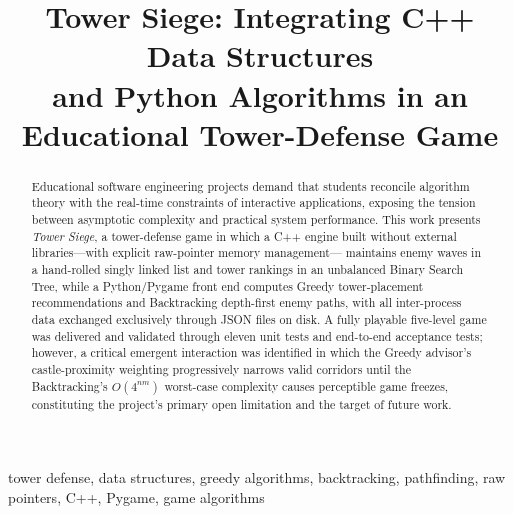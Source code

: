 \documentclass[conference]{IEEEtran}
\begin{document}

\title{Tower Siege: Integrating C++ Data Structures\\and Python Algorithms in an Educational Tower-Defense Game}

\author{
}

\maketitle

\begin{abstract}
Educational software engineering projects demand that students reconcile
algorithm theory with the real-time constraints of interactive applications,
exposing the tension between asymptotic complexity and practical system
performance.
This work presents \emph{Tower Siege}, a tower-defense game in which a C++ engine
built without external libraries—with explicit raw-pointer memory management—
maintains enemy waves in a hand-rolled singly linked list and tower rankings
in an unbalanced Binary Search Tree, while a Python/Pygame front end computes
Greedy tower-placement recommendations and Backtracking depth-first enemy paths,
with all inter-process data exchanged exclusively through JSON files on disk.
A fully playable five-level game was delivered and validated through eleven unit
tests and end-to-end acceptance tests; however, a critical emergent interaction
was identified in which the Greedy advisor's castle-proximity weighting
progressively narrows valid corridors until the Backtracking's $O(4^{nm})$
worst-case complexity causes perceptible game freezes, constituting the project's
primary open limitation and the target of future work.
\end{abstract}

\begin{IEEEkeywords}
tower defense, data structures, greedy algorithms, backtracking, pathfinding,
raw pointers, C++, Pygame, game algorithms
\end{IEEEkeywords}

\end{document}
